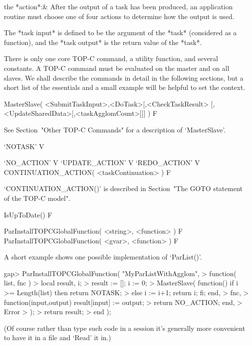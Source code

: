 the *action*:&
    After the output of a task has been produced, an application  routine
    must choose one of four actions to determine how the output is used.

\enditems

The *task input* is defined to be the argument of the *task*  (considered
as a function), and the *task output* is the return value of the *task*.


There is only one core TOP-C command, a  utility  function,  and  several
constants. A TOP-C command must be evaluated on the  master  and  on  all
slaves. We shall  describe  the  commands  in  detail  in  the  following
sections, but a short list of the essentials and a small example will  be
helpful to set the context.

\>MasterSlave( <SubmitTaskInput>,<DoTask>[,<CheckTaskResult>%
               [,<UpdateSharedData>[,<taskAgglomCount>]]] ) F

See Section~"Other TOP-C Commands" for a description of `MasterSlave'.

\>`NOTASK' V

\>`NO_ACTION' V
\>`UPDATE_ACTION' V
\>`REDO_ACTION' V
\>CONTINUATION_ACTION( <taskContinuation> ) F

`CONTINUATION_ACTION()' is described in Section~"The  GOTO  statement  of
the TOP-C model".

\>IsUpToDate() F

\>ParInstallTOPCGlobalFunction( <string>, <function> ) F
\>ParInstallTOPCGlobalFunction( <gvar>, <function> ) F

A short example shows one possible implementation of `ParList()'.

\beginexample
gap> ParInstallTOPCGlobalFunction( "MyParListWithAgglom",
> function( list, fnc )
>   local result, i;
>   result := []; i := 0;
>   MasterSlave( function() if i >= Length(list) then return NOTASK;
>                           else i := i+1; return i; fi; end,
>                fnc,
>                function(input,output) result[input] := output;
>                                       return NO_ACTION; end,
>                Error
>              );
>   return result;
> end );
\endexample

(Of course rather than  type  such  code  in  a  {\ParGAP}  session  it's
generally more convenient to have it in a file and `Read' it in.)

